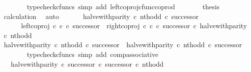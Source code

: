 \begin{isabellebody}
\ \ \ \ \ \ \isamarkupfalse%
\ {\isacharparenleft}{\kern0pt}typecheck{\isacharunderscore}{\kern0pt}cfuncs{\isacharcomma}{\kern0pt}\ simp\ add{\isacharcolon}{\kern0pt}\ left{\isacharunderscore}{\kern0pt}coproj{\isacharunderscore}{\kern0pt}cfunc{\isacharunderscore}{\kern0pt}coprod{\isacharparenright}{\kern0pt}\isanewline
\ \ \ \ \isamarkupfalse%
\ \isamarkupfalse%
\ {\isacharquery}{\kern0pt}thesis\isanewline
\ \ \ \ \ \ \isamarkupfalse%
\ calculation\ \isamarkupfalse%
\ auto\isanewline
\ \ \isamarkupfalse%
\isanewline
\isanewline
\ \ \isamarkupfalse%
\ {\isachardoublequoteopen}{\isacharparenleft}{\kern0pt}halve{\isacharunderscore}{\kern0pt}with{\isacharunderscore}{\kern0pt}parity\ {\isasymcirc}\isactrlsub c\ nth{\isacharunderscore}{\kern0pt}odd{\isacharparenright}{\kern0pt}\ {\isasymcirc}\isactrlsub c\ successor\ {\isacharequal}{\kern0pt}\isanewline
\ \ \ \ \ \ {\isacharparenleft}{\kern0pt}left{\isacharunderscore}{\kern0pt}coproj\ {\isasymnat}\isactrlsub c\ {\isasymnat}\isactrlsub c\ {\isasymcirc}\isactrlsub c\ successor{\isacharparenright}{\kern0pt}\ {\isasymamalg}\ {\isacharparenleft}{\kern0pt}right{\isacharunderscore}{\kern0pt}coproj\ {\isasymnat}\isactrlsub c\ {\isasymnat}\isactrlsub c\ {\isasymcirc}\isactrlsub c\ successor{\isacharparenright}{\kern0pt}\ {\isasymcirc}\isactrlsub c\ halve{\isacharunderscore}{\kern0pt}with{\isacharunderscore}{\kern0pt}parity\ {\isasymcirc}\isactrlsub c\ nth{\isacharunderscore}{\kern0pt}odd{\isachardoublequoteclose}\isanewline
\ \ \isamarkupfalse%
\ {\isacharminus}{\kern0pt}\isanewline
\ \ \ \ \isamarkupfalse%
\ {\isachardoublequoteopen}{\isacharparenleft}{\kern0pt}halve{\isacharunderscore}{\kern0pt}with{\isacharunderscore}{\kern0pt}parity\ {\isasymcirc}\isactrlsub c\ nth{\isacharunderscore}{\kern0pt}odd{\isacharparenright}{\kern0pt}\ {\isasymcirc}\isactrlsub c\ successor\ {\isacharequal}{\kern0pt}\ halve{\isacharunderscore}{\kern0pt}with{\isacharunderscore}{\kern0pt}parity\ {\isasymcirc}\isactrlsub c\ nth{\isacharunderscore}{\kern0pt}odd\ {\isasymcirc}\isactrlsub c\ successor{\isachardoublequoteclose}\isanewline
\ \ \ \ \ \ \isamarkupfalse%
\ {\isacharparenleft}{\kern0pt}typecheck{\isacharunderscore}{\kern0pt}cfuncs{\isacharcomma}{\kern0pt}\ simp\ add{\isacharcolon}{\kern0pt}\ comp{\isacharunderscore}{\kern0pt}associative{}{\isacharparenright}{\kern0pt}\isanewline
\ \ \ \ \isamarkupfalse%
\ \isamarkupfalse%
\ {\isachardoublequoteopen}{\isachardot}{\kern0pt}{\isachardot}{\kern0pt}{\isachardot}{\kern0pt}\ {\isacharequal}{\kern0pt}\ halve{\isacharunderscore}{\kern0pt}with{\isacharunderscore}{\kern0pt}parity\ {\isasymcirc}\isactrlsub c\ {\isacharparenleft}{\kern0pt}successor\ {\isasymcirc}\isactrlsub c\ successor{\isacharparenright}{\kern0pt}\ {\isasymcirc}\isactrlsub c\ nth{\isacharunderscore}{\kern0pt}odd{\isachardoublequoteclose}\isanewline

\end{isabellebody}

